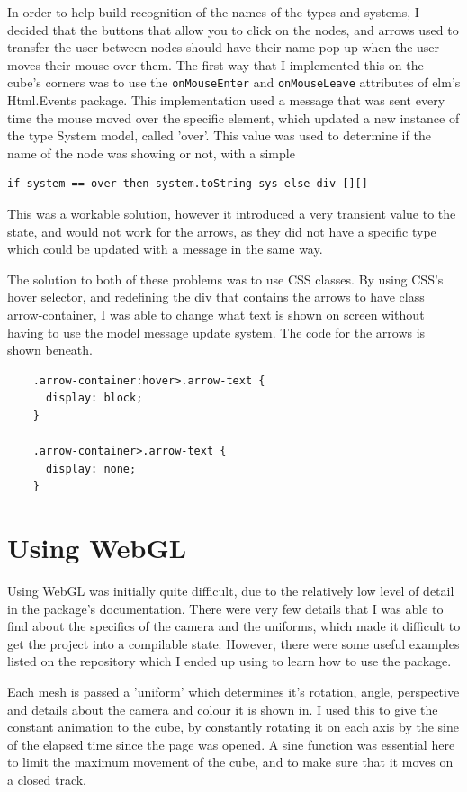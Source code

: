 \documentclass{l4proj}
\begin{document}
In order to help build recognition of the names of the types and systems, I decided that the buttons that allow you to click on the nodes, and arrows used to transfer the user between nodes should have their name pop up when the user moves their mouse over them.  The first way that I implemented this on the cube's corners was to use the \texttt{onMouseEnter} and \texttt{onMouseLeave} attributes of elm's Html.Events package.  This implementation used a message that was sent every time the mouse moved over the specific element, which updated a new instance of the type System model, called 'over'.  This value was used to determine if the name of the node was showing or not, with a simple 
\begin{lstlisting}
if system == over then system.toString sys else div [][]
\end{lstlisting}

This was a workable solution, however it introduced a very transient value to the state, and would not work for the arrows, as they did not have a specific type which could be updated with a message in the same way.

The solution to both of these problems was to use CSS classes.  By using CSS's hover selector, and redefining the div that contains the arrows to have class arrow-container, I was able to change what text is shown on screen without having to use the model message update system.  The code for the arrows is shown beneath.

\begin{lstlisting}
    .arrow-container:hover>.arrow-text {
      display: block;
    }

    .arrow-container>.arrow-text {
      display: none;
    }
\end{lstlisting}

\section{Using WebGL}

Using WebGL was initially quite difficult, due to the relatively low level of detail in the package's documentation.  There were very few details that I was able to find about the specifics of the camera and the uniforms, which made it difficult to get the project into a compilable state.  However, there were some useful examples listed on the repository which I ended up using to learn how to use the package.

Each mesh is passed a 'uniform' which determines it's rotation, angle, perspective and details about the camera and colour it is shown in.  I used this to give the constant animation to the cube, by constantly rotating it on each axis by the sine of the elapsed time since the page was opened.  A sine function was essential here to limit the maximum movement of the cube, and to make sure that it moves on a closed track.
\end{document}
